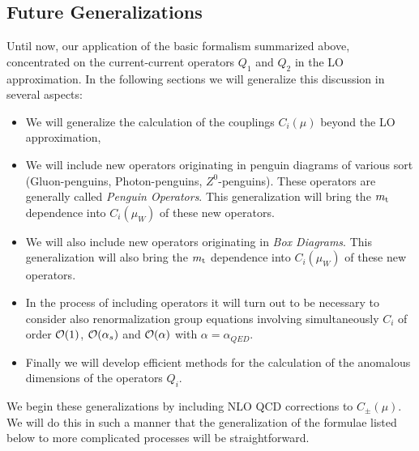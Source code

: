 \documentclass[12pt]{article}
\def\as{\alpha_s}
\newcommand{\mt}{m_{\rm t}}
\newcommand{\ord}{{\cal O}}
\begin{document}
\begin{itemize}
\begin{itemize}
\begin{itemize}
\subsection{Future Generalizations}

Until now, our application of the basic formalism summarized above,
concentrated on the current-current operators $Q_1$ and $Q_2$ in the
LO approximation. In the following sections we will generalize this
discussion in several aspects:

\begin{itemize}
\item
We will generalize the calculation of the couplings $C_i(\mu)$ beyond
the LO approximation,
\item
We will include new operators originating in penguin diagrams 
of various sort (Gluon-penguins, Photon-penguins, $Z^0$-penguins).
These operators are generally called {\it Penguin Operators}. This
generalization will bring the $\mt$ dependence into $C_i(\mu_W)$
of these new operators.
\item
We will also include new operators originating in {\it Box Diagrams}. 
This generalization will also bring the $\mt$ dependence into $C_i(\mu_W)$
of these new operators.
\item
In the process of including operators it will turn out to be necessary
to consider also renormalization group equations involving simultaneously
$C_i$ of order  $\ord (1)$,  $\ord (\as)$ and $\ord(\alpha)$ with
$\alpha=\alpha_{QED}$.
\item
Finally we will develop efficient methods for the calculation of the
anomalous dimensions of the operators $Q_i$.
\end{itemize}

We begin these generalizations by including
NLO QCD corrections to $C_\pm (\mu)$. We will do this in such a manner
that the generalization of the formulae listed below to more complicated
processes will be straightforward.


\end{itemize}
\end{itemize}
\end{itemize}
\end{document}
